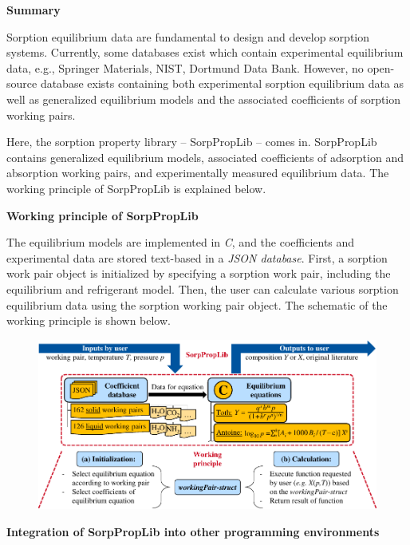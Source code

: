 %
{\large \textbf{\textsf{Summary}}}
\vspace*{3em}

Sorption equilibrium data are fundamental to design and develop sorption systems. Currently, some databases exist which contain experimental equilibrium data, e.g., Springer Materials, NIST, Dortmund Data Bank. However, no open-source database exists containing both experimental sorption equilibrium data as well as generalized equilibrium models and the associated coefficients of sorption working pairs.

Here, the sorption property library – SorpPropLib – comes in. SorpPropLib contains generalized equilibrium models, associated coefficients of adsorption and absorption working pairs, and experimentally measured equilibrium data. The working principle of SorpPropLib is explained below.

\textbf{Working principle of SorpPropLib}

The equilibrium models are implemented in \textit{C}, and the coefficients and experimental data are stored text-based in a \textit{JSON database}. First, a sorption work pair object is initialized by specifying a sorption work pair, including the equilibrium and refrigerant model. Then, the user can calculate various sorption equilibrium data using the sorption working pair object. The schematic of the working principle is shown below.
%
\begin{figure}[!htp]
	{\noindent\includegraphics[width=\textwidth, keepaspectratio]{figs/workflow.pdf}}
\end{figure}

\textbf{Integration of SorpPropLib into other programming environments}

